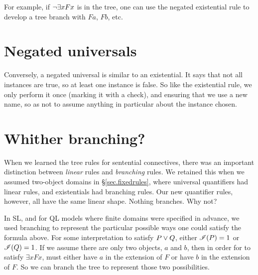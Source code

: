 
For example, if $\neg\exists x Fx$ is in the tree, one can use the negated existential rule to develop a tree branch with \enot $Fa$, \enot $Fb$, etc.

\section{Negated universals}

Conversely, a negated universal is similar to an existential. It says that not all instances are true, so at least one instance is false. So like the existential rule, we only perform it once (marking it with a check), and ensuring that we use a new name, so as not to assume anything in particular about the instance chosen.

\label{negunrule}

\section{Whither branching?}

When we learned the tree rules for sentential connectives, there was an important distinction between \emph{linear} rules and \emph{branching} rules. We retained this when we assumed two-object domains in \S\ref{sec.fixedrules}, where universal quantifiers had linear rules, and existentials had branching rules. Our new quantifier rules, however, all have the same linear shape. Nothing branches. Why not?

In SL, and for QL models where finite domains were specified in advance, we used branching to represent the particular possible ways one could satisfy the formula above. For some interpretation  to satisfy $P \vee Q$, either $\mathscr{I}(P)=1$ or $\mathscr{I}(Q)=1$. If we assume there are only two objects, $a$ and $b$, then in order for  to satisfy $\exists x Fx$,  must either have $a$ in the extension of $F$ or have $b$ in the extension of $F$. So we can branch the tree to represent those two possibilities.

